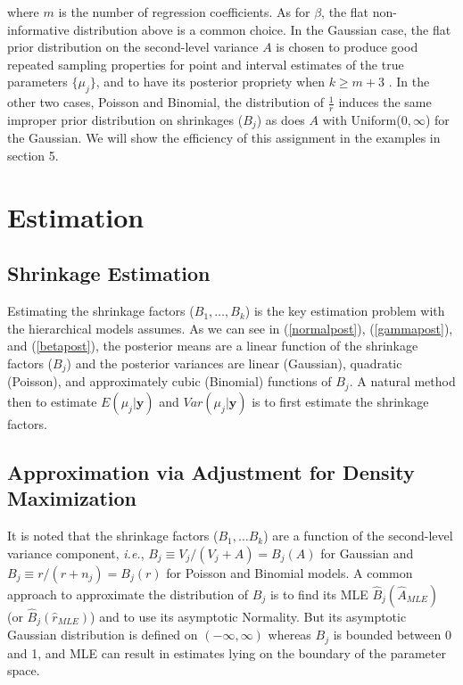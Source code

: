 \documentclass[article]{jss}
\begin{document}
where $m$ is the number of regression coefficients. As for $\beta$, the flat non-informative distribution above is a common choice. In the Gaussian case, the flat prior distribution on the second-level variance $A$ is chosen to produce good repeated sampling properties for point and interval estimates of the true parameters $\{\mu_{j}\}$, and to have its posterior propriety when $k\ge m+3$ \citep{2011}. In the other two cases, Poisson and Binomial, the distribution of $\frac{1}{r}$ induces the same improper prior distribution on shrinkages ($B_{j}$) as does $A$ with Uniform($0, \infty$) for the Gaussian. We will show the efficiency of this assignment  in the examples in section 5.



\section[Estimation]{Estimation}

\subsection[Shrinkage Estimation]{Shrinkage Estimation}
Estimating the shrinkage factors ($B_1, \ldots, B_k$) is the key estimation problem with the hierarchical models  assumes. As we can see in (\ref{normalpost}), (\ref{gammapost}), and (\ref{betapost}), the posterior means are a linear function of the shrinkage factors ($B_{j}$) and the posterior variances are linear (Gaussian), quadratic (Poisson), and  approximately cubic (Binomial) functions of $B_{j}$. A natural method then to estimate $E(\mu_{j}\vert \textbf{y})$ and $Var(\mu_{j}\vert \textbf{y})$ is to first estimate the shrinkage factors.

\subsection[ADM]{Approximation via Adjustment for Density Maximization}\label{ADM}
It is noted that the shrinkage factors ($B_1, \ldots B_k$) are a function of the second-level variance component, \emph{i.e.}, $B_{j}\equiv V_{j}/(V_{j}+A)=B_{j}(A)$ for Gaussian and $B_{j}\equiv r/(r+n_{j})=B_{j}(r)$ for Poisson and Binomial models. A common approach to approximate the distribution of $B_{j}$ is to find its MLE $\hat{B}_{j}(\hat{A}_{MLE})$ (or  $\hat{B}_{j}(\hat{r}_{MLE})$) and to use its asymptotic Normality. But its asymptotic Gaussian distribution is defined on $(-\infty, \infty)$ whereas $B_{j}$ is bounded between 0 and 1, and MLE can result in estimates lying on the boundary of the parameter space.
\end{document}
